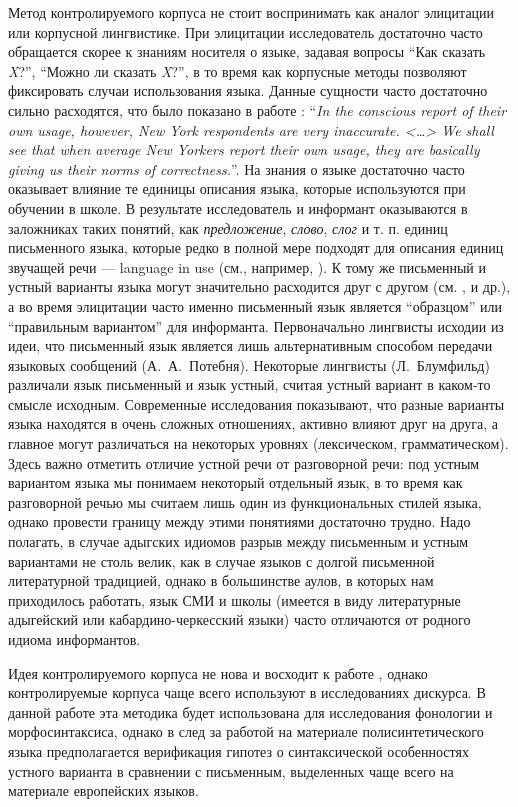 Метод контролируемого корпуса не стоит воспринимать как аналог элицитации или корпусной лингвистике. При элицитации исследователь достаточно часто обращается скорее к знаниям носителя о языке, задавая вопросы ``Как сказать \textit{X}?'', ``Можно ли сказать \textit{X}?'', в то время как корпусные методы позволяют фиксировать случаи использования языка. Данные сущности часто достаточно сильно расходятся, что было показано в работе \citep[300]{labov64}: ``\textit{In the conscious report of their own usage, however, New York respondents are very inaccurate. <\dots> We shall see that when average New Yorkers report their own usage, they are basically giving us their norms of correctness.}''. На знания о языке достаточно часто оказывает влияние те единицы описания языка, которые используются при обучении в школе. В результате исследователь и информант оказываются в заложниках таких понятий, как \textit{предложение}, \textit{слово}, \textit{слог} и т. п. единиц письменного языка, которые редко в полной мере подходят для описания единиц звучащей речи --- language in use (см., например, \citep{miller98}). К тому же письменный и устный варианты языка могут значительно расходится друг с другом (см. \cite[40-42]{lyons68}, \citep{tannen82} и др.), а во время элицитации часто именно письменный язык является ``образцом'' или ``правильным вариантом'' для информанта. Первоначально лингвисты исходии из идеи, что письменный язык является лишь альтернативным способом передачи языковых сообщений (А.~А.~Потебня). Некоторые лингвисты (Л.~Блумфильд) различали язык письменный и язык устный, считая устный вариант в каком-то смысле исходным. Современные исследования показывают, что разные варианты языка находятся в очень сложных отношениях, активно влияют друг на друга, а главное могут различаться на некоторых уровнях (лексическом, грамматическом). Здесь важно отметить отличие устной речи от разговорной речи: под устным вариантом языка  мы понимаем некоторый отдельный язык, в то время как разговорной речью мы считаем лишь один из функциональных стилей языка, однако провести границу между этими понятиями достаточно трудно. Надо полагать, в случае адыгских идиомов разрыв между письменным и устным вариантами не столь велик, как в случае языков с долгой письменной  литературной традицией, однако в большинстве аулов, в которых нам приходилось работать, язык СМИ и школы (имеется в виду литературные адыгейский или кабардино-черкесский языки) часто отличаются от родного идиома информантов.
\par Идея контролируемого корпуса не нова и восходит к работе \citep{chafe80}, однако контролируемые корпуса чаще всего используют в исследованиях дискурса. В данной работе эта методика будет использована для исследования фонологии и морфосинтаксиса, однако в след за работой \citep{tannen82} на материале полисинтетического языка предполагается верификация гипотез о синтаксической особенностях устного варианта в сравнении с письменным, выделенных чаще всего на материале европейских языков.
